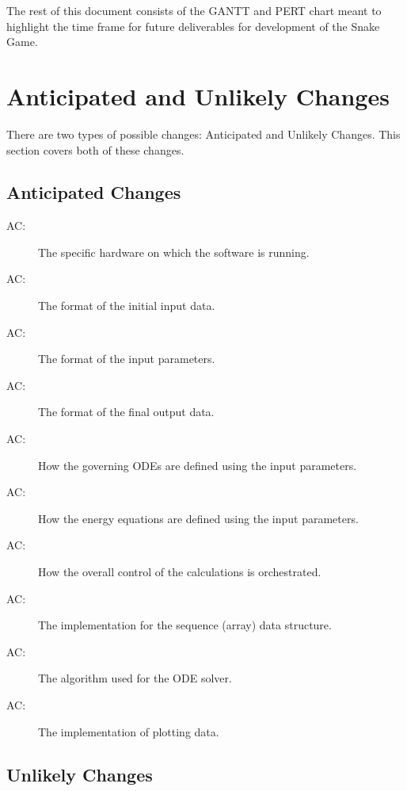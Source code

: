 \documentclass[12pt]{article}
\newcounter{acnum}
\newcommand{\actheacnum}{AC\theacnum}
\begin{document}
The rest of this document consists of the GANTT and PERT chart meant to highlight the time frame for future deliverables for development of the Snake Game.

\section{Anticipated and Unlikely Changes} \label{SecChange}

There are two types of possible changes: Anticipated and Unlikely Changes. This section covers both of these changes.

\subsection{Anticipated Changes} \label{SecAchange}



\begin{description}
\item[ \actheacnum \label{acHardware}:] The specific
  hardware on which the software is running.
\item[ \actheacnum \label{acInput}:] The format of the
  initial input data.
\item[ \actheacnum \label{acParams}:] The format of the
  input parameters.
\item[ \actheacnum \label{acOutput}:] The format of the
  final output data.
\item[ \actheacnum \label{acODEs}:] How the governing ODEs
  are defined using the input parameters.
\item[ \actheacnum \label{acEnergy}:] How the energy
  equations are defined using the input parameters.
\item[ \actheacnum \label{acControl}:] How the overall
  control of the calculations is orchestrated.
\item[ \actheacnum \label{acSeqDS}:] The implementation
  for the sequence (array) data structure.
\item[ \actheacnum \label{acSolver}:] The algorithm used
  for the ODE solver.
\item[ \actheacnum \label{acPlot}:] The implementation of
  plotting data.
\end{description}

\subsection{Unlikely Changes} \label{SecUchange}
\end{document}

